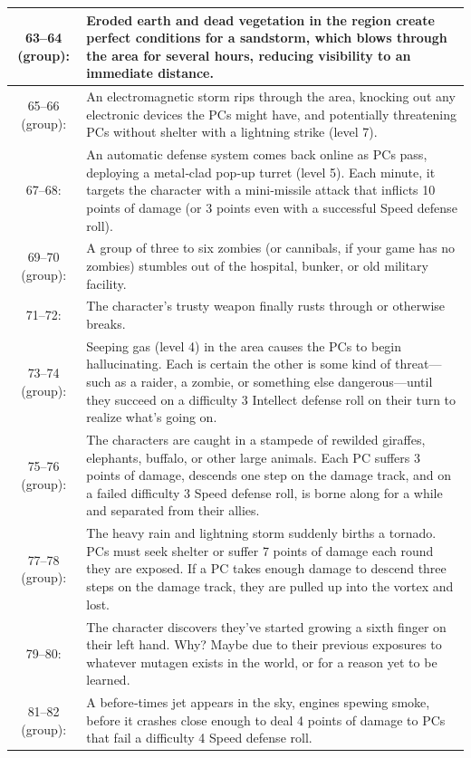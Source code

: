 \begin{longtable}{| c | p{12cm} |}
63–64 (group): &  Eroded earth and dead vegetation in the region create perfect conditions for a sandstorm, which blows through the area for several hours, reducing visibility to an immediate distance. \\ \hline
65–66 (group): &  An electromagnetic storm rips through the area, knocking out any electronic devices the PCs might have, and potentially threatening PCs without shelter with a lightning strike (level 7). \\ \hline
67–68: & An automatic defense system comes back online as PCs pass, deploying a metal‑clad pop‑up turret (level 5). Each minute, it targets the character with a mini‑missile attack that inflicts 10 points of damage (or 3 points even with a successful Speed defense roll). \\ \hline
69–70 (group): &  A group of three to six zombies (or cannibals, if your game has no zombies) stumbles out of the hospital, bunker, or old military facility. \\ \hline
71–72: & The character’s trusty weapon finally rusts through or otherwise breaks. \\ \hline
73–74 (group): &  Seeping gas (level 4) in the area causes the PCs to begin hallucinating. Each is certain the other is some kind of threat—such as a raider, a zombie, or something else dangerous—until they succeed on a difficulty 3 Intellect defense roll on their turn to realize what’s going on. \\ \hline
75–76 (group): &  The characters are caught in a stampede of rewilded giraffes, elephants, buffalo, or other large animals. Each PC suffers 3 points of damage, descends one step on the damage track, and on a failed difficulty 3 Speed defense roll, is borne along for a while and separated from their allies. \\ \hline
77–78 (group): &  The heavy rain and lightning storm suddenly births a tornado. PCs must seek shelter or suffer 7 points of damage each round they are exposed. If a PC takes enough damage to descend three steps on the damage track, they are pulled up into the vortex and lost. \\ \hline
79–80:  & The character discovers they’ve started growing a sixth finger on their left hand. Why? Maybe due to their previous exposures to whatever mutagen exists in the world, or for a reason yet to be learned. \\ \hline
81–82 (group): &  A before‑times jet appears in the sky, engines spewing smoke, before it crashes close enough to deal 4 points of damage to PCs that fail a difficulty 4 Speed defense roll. \\ \hline

\end{longtable}

